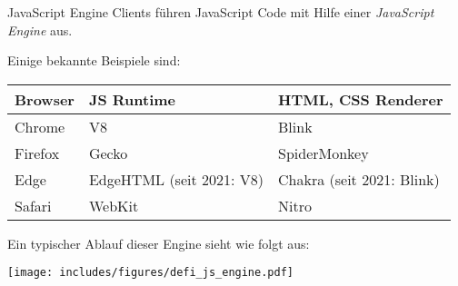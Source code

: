 \begin{defi}{JavaScript Engine}
    Clients führen JavaScript Code mit Hilfe einer \emph{JavaScript Engine} aus.

    Einige bekannte Beispiele sind:

    \begin{center}
        \begin{tabular}{|l|l|l|}
            \hline
            Browser & JS Runtime               & HTML, CSS Renderer         \\\hline\hline
            Chrome  & V8                       & Blink                      \\\hline
            Firefox & Gecko                    & SpiderMonkey               \\\hline
            Edge    & EdgeHTML (seit 2021: V8) & Chakra  (seit 2021: Blink) \\\hline
            Safari  & WebKit                   & Nitro                      \\\hline
        \end{tabular}
    \end{center}

    Ein typischer Ablauf dieser Engine sieht wie folgt aus:

    \begin{center}
        \texttt{[image: includes/figures/defi\_js\_engine.pdf]}
    \end{center}
\end{defi}

